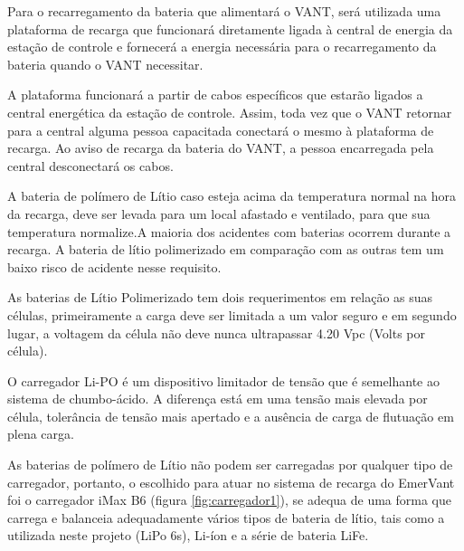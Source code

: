 Para o recarregamento da bateria que alimentará o VANT, será utilizada uma plataforma de recarga que funcionará diretamente ligada à  central de energia da estação de controle e fornecerá a energia necessária para o recarregamento da bateria quando o VANT necessitar.

A plataforma funcionará a partir de cabos específicos que estarão ligados a central energética da estação de controle. Assim, toda vez que o VANT retornar para a central alguma pessoa capacitada conectará o mesmo à plataforma de recarga. Ao aviso de recarga da bateria do VANT, a pessoa encarregada pela central desconectará os cabos.

A bateria de polímero de Lítio caso esteja acima da temperatura normal na hora da recarga, deve ser levada para um local afastado e ventilado, para que sua temperatura normalize.A maioria dos acidentes com baterias ocorrem durante a recarga. A bateria de lítio polimerizado em comparação com as outras tem um baixo risco de acidente nesse requisito. \cite{gibbs}

As baterias de Lítio Polimerizado tem dois requerimentos em relação as suas células, primeiramente a carga deve ser limitada a um valor seguro e em segundo lugar, a voltagem da célula não deve nunca ultrapassar 4.20 Vpc (Volts por célula). \cite{gibbs}

O carregador Li-PO é um dispositivo limitador de tensão que é semelhante ao sistema de chumbo-ácido. A diferença está em uma tensão mais elevada por célula, tolerância de tensão mais apertado e a ausência de carga de flutuação em plena carga.

As baterias de polímero de Lítio não podem ser carregadas por qualquer tipo de carregador, portanto, o escolhido para atuar no sistema de recarga do EmerVant foi o carregador iMax B6 (figura \ref{fig:carregador1}), se adequa de uma forma que carrega e balanceia adequadamente vários tipos de bateria de lítio, tais como a utilizada neste projeto (LiPo 6s), Li-íon e a série de bateria LiFe.


